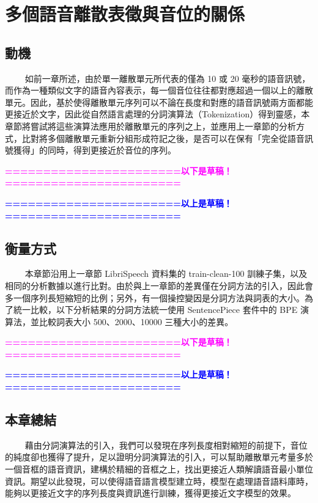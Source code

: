\chapter{多個語音離散表徵與音位的關係}
\newcommand{\myhline}{\noindent\makebox[\linewidth]{\rule{\paperwidth}{0.4pt}}}

\newcommand{\draftbegin}{\centerline{\textcolor{magenta}{\textbf{=======================以下是草稿！=======================}}}}
\newcommand{\drafttermi}{\centerline{\textcolor{blue}{\textbf{=======================以上是草稿！=======================}}}}



\section{動機}
　　
如前一章所述，由於單一離散單元所代表的僅為 10 或 20 毫秒的語音訊號，而作為一種類似文字的語音內容表示，每一個音位往往都對應超過一個以上的離散單元。因此，基於使得離散單元序列可以不論在長度和對應的語音訊號兩方面都能更接近於文字，因此從自然語言處理的分詞演算法（Tokenization）得到靈感，本章節將嘗試將這些演算法應用於離散單元的序列之上，並應用上一章節的分析方式，比對將多個離散單元重新分組形成符記之後，是否可以在保有「完全從語音訊號獲得」的同時，得到更接近於音位的序列。
　　
\draftbegin



\drafttermi

\section{衡量方式}
　　
本章節沿用上一章節 LibriSpeech 資料集的 train-clean-100 訓練子集，以及相同的分析數據以進行比對。由於與上一章節的差異僅在分詞方法的引入，因此會多一個序列長短縮短的比例；另外，有一個操控變因是分詞方法與詞表的大小。為了統一比較，以下分析結果的分詞方法統一使用 SentencePiece 套件中的 BPE 演算法，並比較詞表大小 500、2000、10000 三種大小的差異。

\draftbegin

\newline
\drafttermi

\section{本章總結}
　　
藉由分詞演算法的引入，我們可以發現在序列長度相對縮短的前提下，音位的純度卻也獲得了提升，足以證明分詞演算法的引入，可以幫助離散單元考量多於一個音框的語音資訊，建構於精細的音框之上，找出更接近人類解讀語音最小單位資訊。期望以此發現，可以使得語音語言模型建立時，模型在處理語音語料庫時，能夠以更接近文字的序列長度與資訊進行訓練，獲得更接近文字模型的效果。
